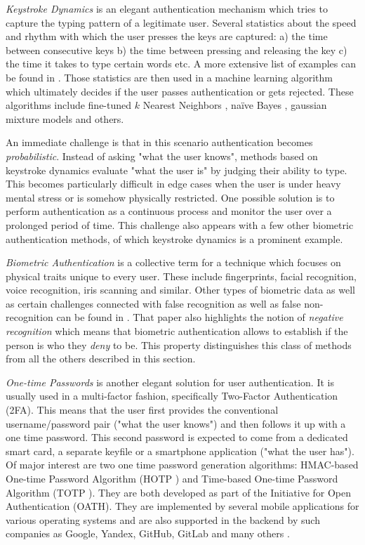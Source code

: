 \emph{Keystroke Dynamics} is an elegant authentication mechanism which tries to capture the typing pattern of a legitimate user. Several statistics about the speed and rhythm with which the user presses the keys are captured: a) the time between consecutive keys b) the time between pressing and releasing the key c) the time it takes to type certain words etc. A more extensive list of examples can be found in \cite{teh:2013:survey-keystroke-biometrics}. Those statistics are then used in a machine learning algorithm which ultimately decides if the user passes authentication or gets rejected. These algorithms include fine-tuned \(k\) Nearest Neighbors \cite{ivannikova:2017:anomaly-detection-keystroke-dynamics}, naïve Bayes \cite{ho:2017:onenb}, gaussian mixture models \cite{yunbin:2013:gmm-keystroke} and others.

An immediate challenge is that in this scenario authentication becomes \emph{probabilistic}. Instead of asking "what the user knows", methods based on keystroke dynamics evaluate "what the user is" by judging their ability to type. This becomes particularly difficult in edge cases when the user is under heavy mental stress or is somehow physically restricted. One possible solution is to perform authentication as a continuous process \cite{bours2012continuous, serwadda2013scan} and monitor the user over a prolonged period of time. This challenge also appears with a few other biometric authentication methods, of which keystroke dynamics is a prominent example.

\emph{Biometric Authentication} is a collective term for a technique which focuses on physical traits unique to every user. These include fingerprints, facial recognition, voice recognition, iris scanning and similar. Other types of biometric data as well as certain challenges connected with false recognition as well as false non-recognition can be found in \cite{jain:2004:intro-to-biometric}. That paper also highlights the notion of \emph{negative recognition} which means that biometric authentication allows to establish if the person is who they \emph{deny} to be. This property distinguishes this class of methods from all the others described in this section.

\emph{One-time Passwords} is another elegant solution for user authentication. It is usually used in a multi-factor fashion, specifically Two-Factor Authentication (2FA). This means that the user first provides the conventional username/password pair ("what the user knows") and then follows it up with a one time password. This second password is expected to come from a dedicated smart card, a separate keyfile or a smartphone application ("what the user has"). Of major interest are two one time password generation algorithms: HMAC-based One-time Password Algorithm (HOTP \cite{rfc4226}) and Time-based One-time Password Algorithm (TOTP \cite{rfc6238}). They are both developed as part of the Initiative for Open Authentication (OATH). They are implemented by several mobile applications for various operating systems and are also supported in the backend by such companies as Google, Yandex, GitHub, GitLab and many others \cite{wiki:2017:hotp-totp-companies}.

